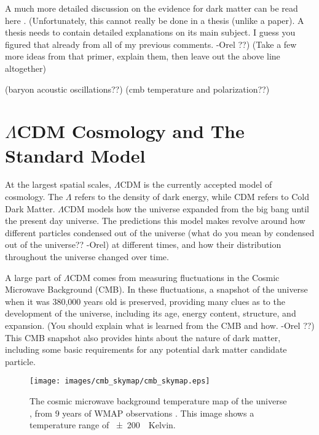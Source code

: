     A much more detailed discussion on the evidence for dark matter can be read here \cite{DMPrimer}.
    {\color{red}(Unfortunately, this cannot really be done in a thesis (unlike a paper). A thesis needs to contain detailed explanations on its main subject. I guess you figured that already from all of my previous comments. -Orel ??)}
    {\color{red}(Take a few more ideas from that primer, explain them, then leave out the above line altogether)}

    {\color{red}(baryon acoustic oscillations??)}
    {\color{red}(cmb temperature and polarization??)}

\section{$\Lambda$CDM Cosmology and The Standard Model}

  At the largest spatial scales, $\Lambda$CDM is the currently accepted model of cosmology.
  The $\Lambda$ refers to the density of dark energy, while CDM refers to Cold Dark Matter.
  $\Lambda$CDM models how the universe expanded from the big bang until the present day universe.
  The predictions this model makes revolve around how different particles {\color{red}condensed out of the universe (what do you mean by condensed out of the universe?? -Orel)} at different times, and how their distribution throughout the universe changed over time.

  A large part of $\Lambda$CDM comes from measuring fluctuations in the Cosmic Microwave Background (CMB).
  In these fluctuations, a snapshot of the universe when it was 380,000 years old is preserved, providing many clues as to the development of the universe, including its age, energy content, structure, and expansion. 
  {\color{red}(You should explain what is learned from the CMB and how. -Orel ??)}
  This CMB snapshot also provides hints about the nature of dark matter, including some basic requirements for any potential dark matter candidate particle.

  \begin{figure}[ht]
    \texttt{[image: images/cmb\_skymap/cmb\_skymap.eps]}
    \caption[The Cosmic Microwave Background]{
      The cosmic microwave background temperature map of the universe \cite{wmap_skymap}, from 9 years of WMAP observations \cite{wmap9year}.
      This image shows a temperature range of \SI{\pm200}{\mu{}Kelvin}.
    }
    \label{fig:cmb}
  \end{figure}

